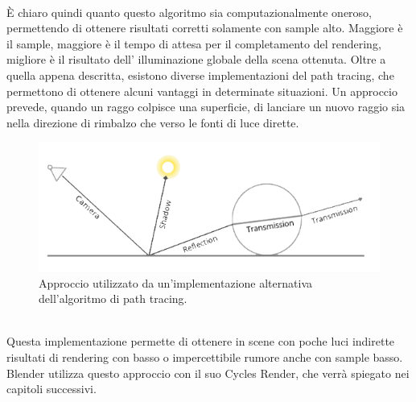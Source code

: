 \\
È chiaro quindi quanto questo algoritmo sia computazionalmente oneroso, permettendo di ottenere risultati corretti solamente con sample alto. Maggiore è il sample, maggiore è il tempo di attesa per il completamento del rendering, migliore è il risultato dell’ illuminazione globale della scena ottenuta.
Oltre a quella appena descritta, esistono diverse implementazioni del path tracing, che permettono di ottenere alcuni vantaggi in determinate situazioni.
Un approccio prevede, quando un raggo colpisce una superficie, di lanciare un nuovo raggio sia nella direzione di rimbalzo che verso le fonti di luce dirette.
\\
\begin{figure}[htb]
 \centering
 \includegraphics[width=0.8\linewidth]{images/chapter_stato_arte/stato_arte_path_alt.png}\hfill
 \caption[Path Tracing: implementazioni alternative]{Approccio utilizzato da un'implementazione alternativa dell'algoritmo di path tracing.}
 \label{fig:stato_arte_path_alt}
\end{figure}
\\
Questa implementazione permette di ottenere in scene con poche luci indirette risultati di rendering con basso o impercettibile rumore anche con sample basso. 
Blender utilizza questo approccio con il suo Cycles Render, che verrà spiegato nei capitoli successivi.

